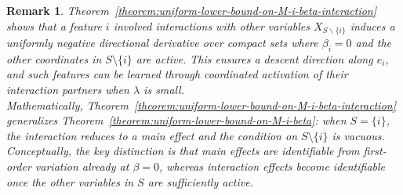 \documentclass[sn-mathphys-num]{sn-jnl}%
\numberwithin{equation}{section}
\theoremstyle{thmstyleone}%
\theoremstyle{thmstyletwo}%
\newtheorem{remark}{Remark}%
\theoremstyle{thmstylethree}%
\begin{document}
\begin{remark}
\emph{
Theorem~\ref{theorem:uniform-lower-bound-on-M-i-beta-interaction} shows that a feature $i$ involved interactions with other variables $X_{S\backslash \{i\}}$ induces a uniformly negative directional derivative over compact sets where $\beta_i = 0$ and the other coordinates in $S \setminus \{i\}$ are active. This ensures a descent direction along $e_i$, and such features can be learned through coordinated activation of their interaction partners when $\lambda$ is small.  \\ \indent 
Mathematically, Theorem~\ref{theorem:uniform-lower-bound-on-M-i-beta-interaction} generalizes Theorem~\ref{theorem:uniform-lower-bound-on-M-i-beta}: when $S = \{i\}$, the interaction reduces to a main effect and the condition on $S \setminus \{i\}$ is vacuous. Conceptually, the key distinction is that main effects are identifiable from first-order variation already at $\beta = 0$, whereas interaction effects become identifiable once the other variables in $S$ are sufficiently active. %
}
\end{remark}
\end{document}
